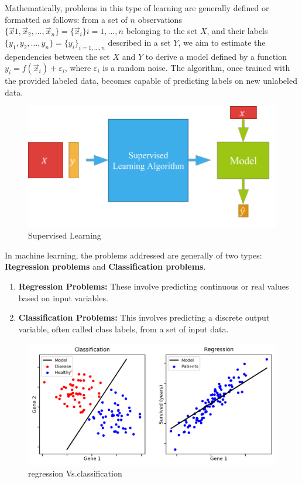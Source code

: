Mathematically, problems in this type of learning are generally defined or formatted as follows: from a set of \( n \) observations \(\{\vec{x}1, \vec{x}_2, \ldots, \vec{x}_n\} = \{\vec{x}_i\}{i=1,\ldots,n}\) belonging to the set \(X\), and their labels \(\{y_1, y_2, \ldots, y_n\} = \{y_i\}_{i=1,\ldots,n}\) described in a set \(Y\), we aim to estimate the dependencies between the set \(X\) and \(Y\) to derive a model defined by a function \(y_i = f(\vec{x}_i) + \varepsilon_i\), where \(\varepsilon_i\) is a random noise. The algorithm, once trained with the provided labeled data, becomes capable of predicting labels on new unlabeled data.\\

\begin{figure}[ht!]
	\centering
	\includegraphics[scale=0.8]{Chap1/images/supervise.png}
	\caption{Supervised Learning}
	\label{fig:regressionvsclassification}
\end{figure}

In machine learning, the problems addressed are generally of two types: \textbf{Regression problems} and \textbf{Classification problems}.
\begin{enumerate}
	\item \textbf{Regression Problems:} These involve predicting continuous or real values based on input variables.
	\item \textbf{Classification Problems:} This involves predicting a discrete output variable, often called class labels, from a set of input data.
\end{enumerate}

\begin{figure}[ht!]
    \centering
    \includegraphics[width=0.6\linewidth]{chap1/images/regressionVSclassification.png}
    \caption{regression Vs.classification\cite{tensorflow2023}}
    \label{fig:enter-label}
\end{figure}

